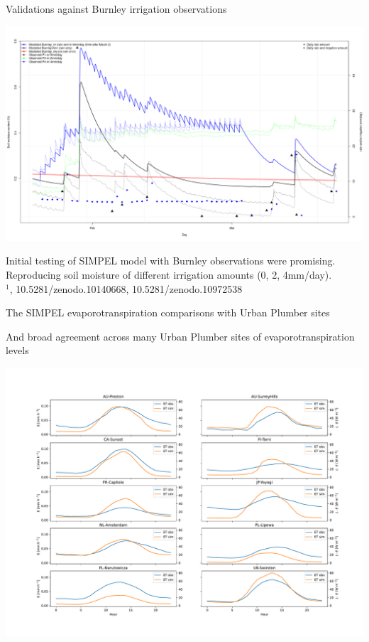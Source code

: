 \documentclass{beamer}
\begin{document}
\begin{frame}{Validations against Burnley irrigation observations} 
\begin{center}
\includegraphics[scale=0.18]{BurnleyComparisons.png}
\end{center}

Initial testing of SIMPEL model with Burnley observations were promising. Reproducing soil moisture of different irrigation amounts (0, 2, 4mm/day).
\\
$^{1}${\footnotesize \cite{Cheung2024}, 10.5281/zenodo.10140668, 10.5281/zenodo.10972538}
\end{frame}



\begin{frame}{The SIMPEL evaporotranspiration comparisons with Urban Plumber sites} 

{\footnotesize And broad agreement across many Urban Plumber sites of evaporotranspiration levels}
\begin{center}
\includegraphics[scale=0.24]{et_presunangle.pdf}
\end{center}
\end{frame}
\end{document}
